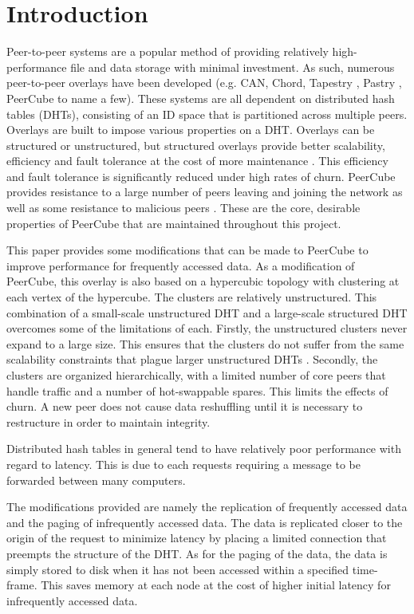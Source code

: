 \documentclass[12pt]{report}
\theoremstyle{plain}
\begin{document}
\section*{Introduction}
\hspace{1em}
Peer-to-peer systems are a popular method of providing relatively high-performance file and data storage with minimal investment. As such, numerous peer-to-peer overlays have been developed (e.g. CAN\cite{ratnasamy_scalable_2001}, Chord\cite{stoica_chord:_2001}, Tapestry \cite{zhao_tapestry:_2001}, Pastry \cite{rowstron_pastry:_2001}, PeerCube\cite{anceaume_peercube:_2008} to name a few). These systems are all dependent on distributed hash tables (DHTs), consisting of an ID space that is partitioned across multiple peers. Overlays are built to impose various properties on a DHT. Overlays can be structured or unstructured, but structured overlays provide better scalability, efficiency and fault tolerance at the cost of more maintenance \cite{locher_equus:_2006}. This efficiency and fault tolerance is significantly reduced under high rates of churn. PeerCube provides resistance to a large number of peers leaving and joining the network as well as some resistance to malicious peers \cite{anceaume_peercube:_2008}. These are the core, desirable properties of PeerCube that are maintained throughout this project.

This paper provides some modifications that can be made to PeerCube to improve performance for frequently accessed data. As a modification of PeerCube, this overlay is also based on a hypercubic topology with clustering at each vertex of the hypercube. The clusters are relatively unstructured. This combination of a small-scale unstructured DHT and a large-scale structured DHT overcomes some of the limitations of each. Firstly, the unstructured clusters never expand to a large size. This ensures that the clusters do not suffer from the same scalability constraints that plague larger unstructured DHTs \cite{lua_survey_2005}. Secondly, the clusters are organized hierarchically, with a limited number of core peers that handle traffic and a number of hot-swappable spares. This limits the effects of churn. A new peer does not cause data reshuffling until it is necessary to restructure in order to maintain integrity.

Distributed hash tables in general tend to have relatively poor performance with regard to latency. This is due to each requests requiring a message to be forwarded between many computers.

The modifications provided are namely the replication of frequently accessed data and the paging of infrequently accessed data. The data is replicated closer to the origin of the request to minimize latency by placing a limited connection that preempts the structure of the DHT. As for the paging of the data, the data is simply stored to disk when it has not been accessed within a specified time-frame. This saves memory at each node at the cost of higher initial latency for infrequently accessed data.
\end{document}

